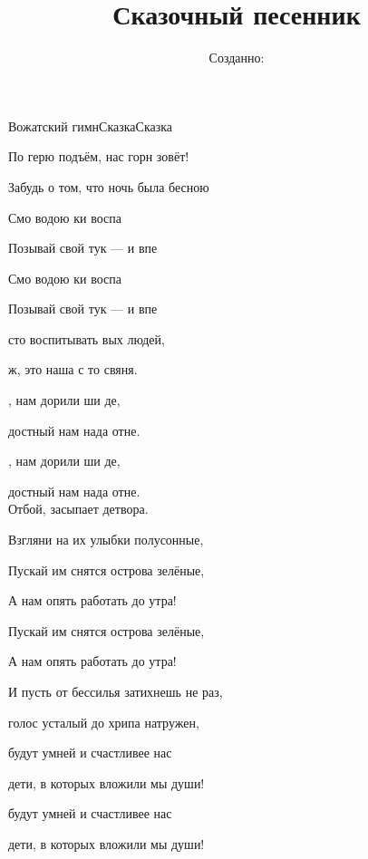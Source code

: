 \documentclass[11pt,a5paper]{book}
\title{ Сказочный песенник}
\author{}
\date{Созданно:  \RevDate}
\renewcommand{\tt}{\indent \indent}
\begin{document}
 
\maketitle

\mainmatter


\begin{song}{Вожатский гимн}{}{Сказка}{Сказка}{}{}

По герю подъём, нас горн зовёт!\par
Забудь о том, что ночь была бесною\par
Смо водою ки воспа\par    
Позывай свой тук — и впе\par
Смо водою ки воспа\par    
Позывай свой тук — и впе\par

сто воспитывать вых людей,\par
{}  ж, это наша с то свяня.\par
{} , нам дорили ши де,\par
{} достный  нам нада отне.\par
{} , нам дорили ши де,\par
{} достный  нам нада отне.\\

Отбой, засыпает детвора.\par
Взгляни на их улыбки полусонные,\par
Пускай им снятся острова зелёные,\par
А нам опять работать до утра!\par
Пускай им снятся острова зелёные,\par
А нам опять работать до утра!\par

\tt И пусть от бессилья затихнешь не раз,\par
{} голос усталый до хрипа натружен,\par
{} будут умней и счастливее нас\par
{} дети, в которых вложили мы души!\par
{} будут умней и счастливее нас\par
{} дети, в которых вложили мы души!

\end{song}
\end{document}
